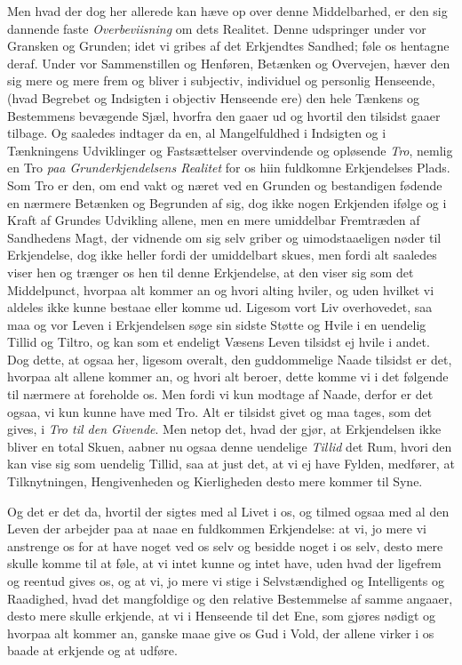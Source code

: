 \documentclass[12pt,a4paper]{book}
\newcommand{\apage}[1]{\marginnote{\footnotesize\textit{[#1]}}}
\begin{document}
Men hvad der dog her allerede kan hæve op over denne Middelbarhed, er den sig
dannende faste \emph{Overbeviisning} om dets Realitet. Denne udspringer under vor
Gransken og Grunden; idet vi gribes af det Erkjendtes Sandhed; føle os hentagne
deraf. Under vor Sammenstillen og Henføren, Betænken og Overvejen, hæver den sig
mere og mere frem og bliver i subjectiv, individuel og personlig Henseende, (hvad
Begrebet og Indsigten i objectiv Henseende ere) den hele Tænkens og Bestemmens
bevægende Sjæl, hvorfra den gaaer ud og hvortil den tilsidst gaaer tilbage. Og
saaledes indtager da en, al Mangelfuldhed i Indsigten og i Tænkningens \apage{44} 
Udviklinger og Fastsættelser overvindende og opløsende \emph{Tro}, nemlig en
Tro \emph{paa Grunderkjendelsens Realitet} for os hiin fuldkomne Erkjendelses
Plads. Som Tro er den, om end vakt og næret ved en Grunden og bestandigen fødende
en nærmere Betænken og Begrunden af sig, dog ikke nogen Erkjenden ifølge og i
Kraft af Grundes Udvikling allene, men en mere umiddelbar Fremtræden af
Sandhedens Magt, der vidnende om sig selv griber og uimodstaaeligen nøder til
Erkjendelse, dog ikke heller fordi der umiddelbart skues, men fordi alt saaledes
viser hen og trænger os hen til denne Erkjendelse, at den viser sig som det
Middelpunct, hvorpaa alt kommer an og hvori alting hviler, og uden hvilket vi
aldeles ikke kunne bestaae eller komme ud. Ligesom vort Liv overhovedet, saa maa
og vor Leven i Erkjendelsen søge sin sidste Støtte og Hvile i en uendelig Tillid
og Tiltro, og kan som et endeligt Væsens Leven tilsidst ej hvile i andet. Dog
dette, at ogsaa her, ligesom overalt, den guddommelige Naade tilsidst er det,
hvorpaa alt allene kommer an, og hvori alt beroer, dette komme vi i det følgende
til nærmere at foreholde os. Men fordi vi kun modtage af Naade, derfor er det
ogsaa, vi kun kunne have med Tro. Alt er tilsidst givet og maa tages, som det
gives, i \emph{Tro til den Givende}. Men netop det, hvad der gjør, at Erkjendelsen ikke
bliver en total Skuen, aabner nu ogsaa denne uendelige \apage{45}  \emph{Tillid} det Rum, hvori den
kan vise sig som uendelig Tillid, saa at just det, at vi ej have Fylden,
medfører, at Tilknytningen, Hengivenheden og Kierligheden desto mere kommer til
Syne.

Og det er det da, hvortil der sigtes med al Livet i os, og tilmed ogsaa med al
den Leven der arbejder paa at naae en fuldkommen Erkjendelse: at vi, jo mere vi
anstrenge os for at have noget ved os selv og besidde noget i os selv, desto mere
skulle komme til at føle, at vi intet kunne og intet have, uden hvad der ligefrem
og reentud gives os, og at vi, jo mere vi stige i Selvstændighed og Intelligents
og Raadighed, hvad det mangfoldige og den relative Bestemmelse af samme angaaer,
desto mere skulle erkjende, at vi i Henseende til det Ene, som gjøres nødigt og
hvorpaa alt kommer an, ganske maae give os Gud i Vold, der allene virker i os
baade at erkjende og at udføre.
\end{document}
